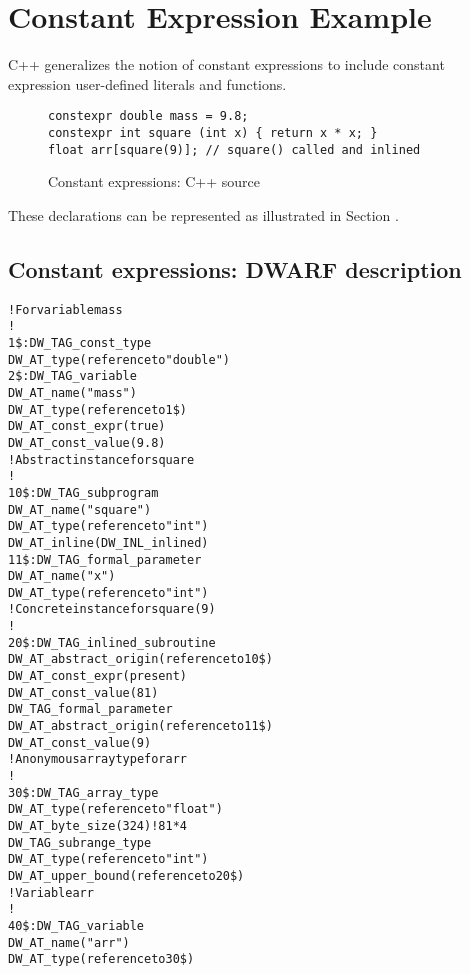 \section{Constant Expression Example}
\label{app:constantexpressionexample}
C++ generalizes the notion of constant expressions to include
constant expression user-defined literals and functions.

\begin{figure}[here]
\begin{lstlisting}
constexpr double mass = 9.8;
constexpr int square (int x) { return x * x; }
float arr[square(9)]; // square() called and inlined
\end{lstlisting}
\caption{Constant expressions: C++ source} \label{fig:constantexpressionscsource}
\end{figure}

These declarations can be represented as illustrated in 
Section .

\subsection{Constant expressions: DWARF description}
\label{app:constantexpressionsdwarfdescription}
\begin{alltt}

      ! For variable mass
      !
1\$:  DW\_TAG\_const\_type
        DW\_AT\_type(reference to "double")
2\$:  DW\_TAG\_variable
        DW\_AT\_name("mass")
        DW\_AT\_type(reference to 1\$)
        DW\_AT\_const\_expr(true)
        DW\_AT\_const\_value(9.8)
      ! Abstract instance for square
      !
10\$: DW\_TAG\_subprogram
        DW\_AT\_name("square")
        DW\_AT\_type(reference to "int")
        DW\_AT\_inline(DW\_INL\_inlined)
11\$:   DW\_TAG\_formal\_parameter
            DW\_AT\_name("x")
            DW\_AT\_type(reference to "int")
      ! Concrete instance for square(9)
      !
20\$: DW\_TAG\_inlined\_subroutine
        DW\_AT\_abstract\_origin(reference to 10\$)
        DW\_AT\_const\_expr(present)
        DW\_AT\_const\_value(81)
        DW\_TAG\_formal\_parameter
            DW\_AT\_abstract\_origin(reference to 11\$)
            DW\_AT\_const\_value(9)
      ! Anonymous array type for arr
      !
30\$: DW\_TAG\_array\_type
        DW\_AT\_type(reference to "float")
        DW\_AT\_byte\_size(324) ! 81*4
        DW\_TAG\_subrange\_type
            DW\_AT\_type(reference to "int")
            DW\_AT\_upper\_bound(reference to 20\$)
      ! Variable arr
      !
40\$: DW\_TAG\_variable
        DW\_AT\_name("arr")
        DW\_AT\_type(reference to 30\$)
\end{alltt}


